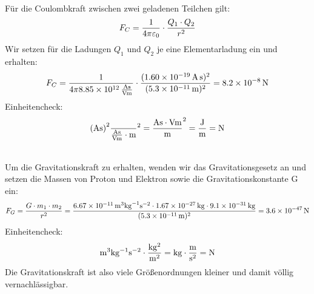 \documentclass[a4paper]{article}
\begin{document}
\vspace{0.5 cm}

\\
Für die Coulombkraft zwischen zwei geladenen Teilchen gilt:
$$F_C = {1 \over 4 \pi \varepsilon_0}\cdot {Q_1\cdot Q_2 \over r^2}$$
Wir setzen für die Ladungen $Q_1$ und $Q_2$ je eine Elementarladung ein und erhalten:
$$F_C = {1 \over 4 \pi \SI{8,85e12}{\ampere\second\over \volt\meter}}\cdot {(\SI{1,60e-19}{\ampere\second})^2 \over (\SI{5,3e-11}{\meter})^2}=\SI{8,2e-8}{\newton}$$
Einheitencheck:
$$\SI{}{(\ampere\second)^2 \over {\ampere\second \over \volt\meter} \cdot m^2}=\SI{}{\ampere\second \cdot \volt\meter \over \meter^2}= \SI{}{\joule \over \meter} = \SI{}{\newton} $$
\vspace{0.5 cm}

\\
Um die Gravitationskraft zu erhalten, wenden wir das Gravitationsgesetz an und setzen die Massen von Proton und Elektron sowie die Gravitationskonstante G ein:  
$$ F_G = {G \cdot m_1 \cdot m_2 \over r^2} = { \SI{6,67e-11}{\meter^3 \kilogram^{-1} \second^{-2}} \cdot\SI{1,67e-27}{\kilogram} \cdot\SI{9,1e-31}{\kilogram} \over (\SI{5,3e-11}{\meter})^2}=\SI{3,6e-47}{\newton}$$
Einheitencheck:
$$\SI{}{{\meter^3 \kilogram^{-1} \second^{-2}} \cdot {{\kilogram^2} \over \meter^2}}= \SI{}{\kilogram \cdot {\meter \over \second^2}} = \SI{}{\newton}$$
Die Gravitationskraft ist also viele Größenordnungen kleiner und damit völlig vernachlässigbar.
\vspace{0.5 cm}
\end{document}

